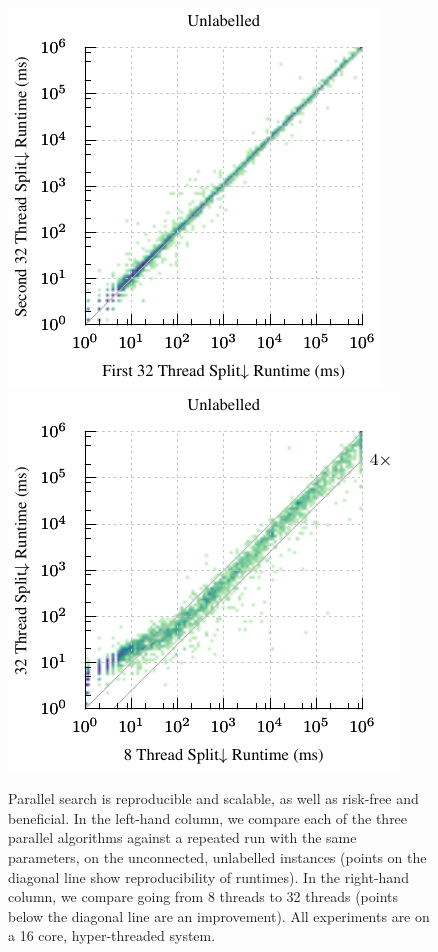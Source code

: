 \documentclass{llncs}
\begin{document}
\begin{figure}[p]
    \vspace*{1em}
    \centering
    \hspace*{1em}\includegraphics*[scale=0.7]{plots/plain-james-par-repeat-heatmap.pdf}\hfill
    \includegraphics*[scale=0.7]{plots/plain-james-par-8to32-heatmap.pdf}\hspace*{1em}

    \caption{Parallel search is reproducible and scalable, as well as risk-free and beneficial. In the
    left-hand column, we compare each of the three parallel algorithms against a repeated run with
    the same parameters, on the unconnected, unlabelled instances (points on the diagonal line show
    reproducibility of runtimes). In the right-hand column, we compare going from 8 threads to 32
    threads (points below the diagonal line are an improvement). All experiments are on a 16 core,
    hyper-threaded system.}
    \label{figure:mcs-par-repeats}
\end{figure}
\end{document}
